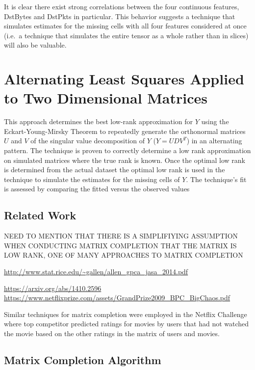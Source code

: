 \documentclass[12pt,twoside]{dukestatscithesis}
\theoremstyle{definition}
\theoremstyle{definition}
\theoremstyle{definition}
\theoremstyle{remark}
\begin{document}
It is clear there exist strong correlations between the four continuous
features, DstBytes and DstPkts in particular. This behavior suggests a
technique that simulates estimates for the missing cells with all four
features considered at once (i.e.~a technique that simulates the entire
tensor as a whole rather than in slices) will also be valuable.

\chapter{Alternating Least Squares Applied to Two Dimensional
Matrices}\label{alternating-least-squares-applied-to-two-dimensional-matrices}

This approach determines the best low-rank approximation for \(Y\) using
the Eckart-Young-Mirsky Theorem to repeatedly generate the orthonormal
matrices \(U\) and \(V\) of the singular value decomposition of \(Y\)
(\(Y = UDV^T\)) in an alternating pattern. The technique is proven to
correctly determine a low rank approximation on simulated matrices where
the true rank is known. Once the optimal low rank is determined from the
actual dataset the optimal low rank is used in the technique to simulate
the estimates for the missing cells of \(Y\). The technique's fit is
assessed by comparing the fitted versus the observed values

\section{Related Work}\label{related-work}

NEED TO MENTION THAT THERE IS A SIMPLIFIYING ASSUMPTION WHEN CONDUCTING
MATRIX COMPLETION THAT THE MATRIX IS LOW RANK, ONE OF MANY APPROACHES TO
MATRIX COMPLETION

\url{http://www.stat.rice.edu/~gallen/allen_gpca_jasa_2014.pdf}

\url{https://arxiv.org/abs/1410.2596}
\url{https://www.netflixprize.com/assets/GrandPrize2009_BPC_BigChaos.pdf}

Similar techniques for matrix completion were employed in the Netflix
Challenge where top competitor predicted ratings for movies by users
that had not watched the movie based on the other ratings in the matrix
of users and movies.

\section{Matrix Completion Algorithm}\label{matrix-completion-algorithm}
\end{document}
